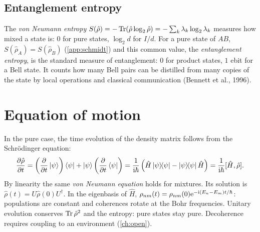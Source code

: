\subsection{Entanglement entropy}
The \emph{von Neumann entropy} $S(\hat\rho)=-\operatorname{Tr}(\hat\rho\log_2\hat\rho)=-\sum_k\lambda_k\log_2\lambda_k$ measures how mixed a state is: $0$ for pure states, $\log_2d$
for $I/d$. For a pure state of $AB$, $S(\hat\rho_A)=S(\hat\rho_B)$ (\cref{app:schmidt}) and this common value, the \emph{entanglement entropy}, is the standard measure of
entanglement: $0$ for product states, $1$ ebit for a Bell state. It counts how many Bell pairs can be distilled from many copies of the state by local operations and
classical communication (Bennett et al., 1996).

\section{Equation of motion}
In the pure case, the time evolution of the density matrix follows from the Schrödinger equation:
\begin{equation}
  \frac{\partial\hat\rho}{\partial t}=\left(\frac{\partial}{\partial t}\left|\psi\right\rangle\right)\left\langle\psi\right|+\left|\psi\right\rangle\left(\frac{\partial}{\partial t}\left\langle\psi\right|\right)
  =\frac1{\mathrm i\hbar}\left(\hat H\left|\psi\middle\rangle\!\middle\langle\psi\right|-\left|\psi\middle\rangle\!\middle\langle\psi\right|\hat H\right)=\frac1{\mathrm i\hbar}[\hat H,\hat\rho].
\end{equation}
By linearity the same \emph{von Neumann equation} holds for mixtures. Its solution is $\hat\rho(t)=U\hat\rho(0)U^\dagger$. In the eigenbasis of $\hat H$,
$\rho_{nm}(t)=\rho_{nm}(0)\mathrm e^{-\mathrm i(E_n-E_m)t/\hbar}$: populations are constant and coherences rotate at the Bohr frequencies. Unitary evolution conserves $\operatorname{Tr}\hat\rho^2$
and the entropy: pure states stay pure. Decoherence requires coupling to an environment (\cref{ch:open}).

